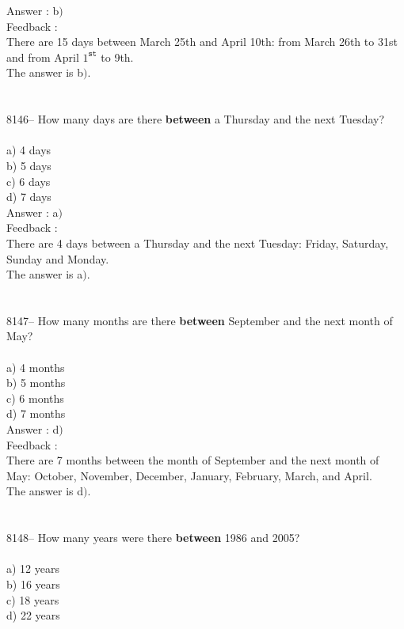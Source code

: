 \documentclass[letterpaper, 12pt]{article}
\begin{document}
Answer : b$)$\\

Feedback :\\
There are 15 days between March 25th and April 10th: from March 26th to 31st and from April $1^{\texttt{st}}$ to 9th. \\
The answer is b$)$.\\
\\
\\
8146-- How many days are there \textbf{between} a Thursday and the next Tuesday?\\
\\
a) 4 days\\
b) 5 days\\
c) 6 days\\
d) 7 days\\

Answer : a$)$\\

Feedback :\\
There are 4 days between a Thursday and the next Tuesday: Friday, Saturday, Sunday and Monday. \\
The answer is a$)$.\\
\\
\\
8147-- How many months are there \textbf{between} September and the next month of May?\\
\\
a) 4 months\\
b) 5 months\\
c) 6 months\\
d) 7 months\\

Answer : d$)$\\

Feedback :\\
There are 7 months between the month of September and the next month of May: October, November, December, January, February, March, and April. \\
The answer is d$)$.\\
\\
\\
8148-- How many years were there \textbf{between} 1986 and 2005?\\
\\
a) 12 years\\
b) 16 years\\
c) 18 years\\
d) 22 years\\
\end{document}
